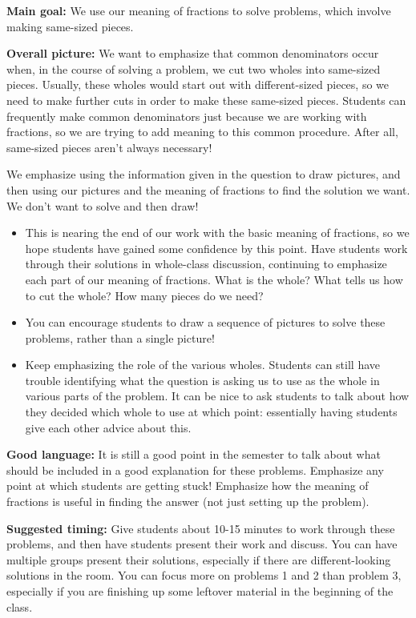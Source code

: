 \documentclass[nooutcomes,noauthor]{ximera}
\begin{document}
\newpage

\begin{instructorNotes} 
{\bf Main goal:} We use our meaning of fractions to solve problems, which involve making same-sized pieces.


{\bf Overall picture:} We want to emphasize that common denominators occur when, in the course of solving a problem, we cut two wholes into same-sized pieces. Usually, these wholes would start out with different-sized pieces, so we need to make further cuts in order to make these same-sized pieces. Students can frequently make common denominators just because we are working with fractions, so we are trying to add meaning to this common procedure. After all, same-sized pieces aren't always necessary! 

We emphasize using the information given in the question to draw pictures, and then using our pictures and the meaning of fractions to find the solution we want. We don't want to solve and then draw!

\begin{itemize}
	\item This is nearing the end of our work with the basic meaning of fractions, so we hope students have gained some confidence by this point. Have students work through their solutions in whole-class discussion, continuing to emphasize each part of our meaning of fractions. What is the whole? What tells us how to cut the whole? How many pieces do we need?
	\item You can encourage students to draw a sequence of pictures to solve these problems, rather than a single picture!
	\item Keep emphasizing the role of the various wholes. Students can still have trouble identifying what the question is asking us to use as the whole in various parts of the problem. It can be nice to ask students to talk about how they decided which whole to use at which point: essentially having students give each other advice about this.
\end{itemize}


{\bf Good language:}  It is still a good point in the semester to talk about what should be included in a good explanation for these problems. Emphasize any point at which students are getting stuck! Emphasize how the meaning of fractions is useful in finding the answer (not just setting up the problem).


{\bf Suggested timing:} Give students about 10-15 minutes to work through these problems, and then have students present their work and discuss. You can have multiple groups present their solutions, especially if there are different-looking solutions in the room. You can focus more on problems 1 and 2 than problem 3, especially if you are finishing up some leftover material in the beginning of the class.






\end{instructorNotes}
\end{document}
